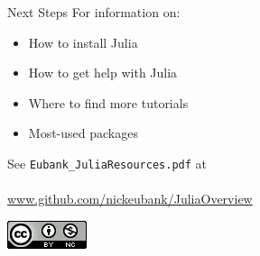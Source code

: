 \documentclass[11pt]{beamer}
\begin{document}
\begin{frame}[c]{Next Steps}
For information on:
\begin{itemize}
    \item How to install Julia
    \item How to get help with Julia
    \item Where to find more tutorials
    \item Most-used packages
\end{itemize}
See \texttt{Eubank\_JuliaResources.pdf} at \\
\vspace*{0.2cm} \\
\url{www.github.com/nickeubank/JuliaOverview}\\
\vspace{0.2cm}

\begin{center}
    \includegraphics[scale=0.5]{figures/creativecommons.png}
\end{center}

\end{frame}
\end{document}
